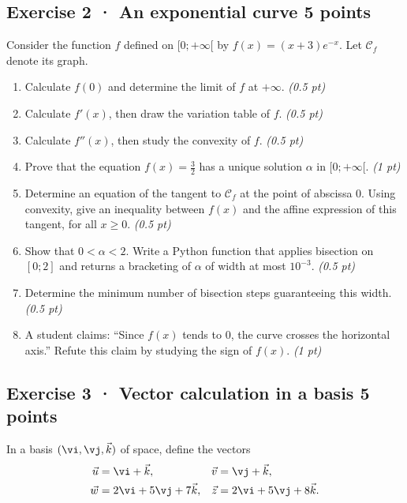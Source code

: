 \subsection*{Exercise 2 · An exponential curve \hfill 5 points}Consider the function $f$ defined on $[0;+\infty[$ by $f(x)=(x+3)e^{-x}$. Let $\mathcal C_f$ denote its graph.

\begin{enumerate}

\item Calculate $f(0)$ and determine the limit of $f$ at $+\infty$. \hfill\textit{(0.5 pt)}

\item Calculate $f'(x)$, then draw the variation table of $f$. \hfill\textit{(0.5 pt)}

\item Calculate $f''(x)$, then study the convexity of $f$. \hfill\textit{(0.5 pt)}

\item Prove that the equation $f(x)=\frac{3}{2}$ has a unique solution $\alpha$ in $[0;+\infty[$. \hfill\textit{(1 pt)}

\item Determine an equation of the tangent to $\mathcal C_f$ at the point of abscissa $0$. Using convexity, give an inequality between $f(x)$ and the affine expression of this tangent, for all $x\ge0$. \hfill\textit{(0.5 pt)}

\item Show that $0<\alpha<2$. Write a Python function that applies bisection on $[0;2]$ and returns a bracketing of $\alpha$ of width at most $10^{-3}$. \hfill\textit{(0.5 pt)}

\item Determine the minimum number of bisection steps guaranteeing this width. \hfill\textit{(0.5 pt)}

\clearpage\item A student claims: ``Since $f(x)$ tends to $0$, the curve crosses the horizontal axis.'' Refute this claim by studying the sign of $f(x)$. \hfill\textit{(1 pt)}

\end{enumerate}

\clearpage{}\par

\subsection*{Exercise 3 · Vector calculation in a basis \hfill 5 points}In a basis $(\vi,\vj,\vec k)$ of space, define the vectors
\[\begin{aligned}\vec u&=\vi+\vec k,&\vec v&=\vj+\vec k,\\
\vec w&=2\vi+5\vj+7\vec k,&\vec z&=2\vi+5\vj+8\vec k.\end{aligned}\]

